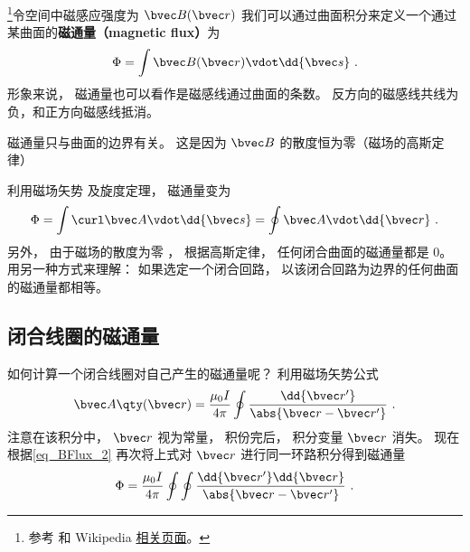 
\begin{issues}
\issueDraft
{}
\end{issues}


\footnote{参考 \cite{GriffE} 和 Wikipedia \href{https://en.wikipedia.org/wiki/Magnetic_flux}{相关页面}。}令空间中磁感应强度为 $\bvec B(\bvec r)$ 我们可以通过曲面积分来定义一个通过某曲面的\textbf{磁通量（magnetic flux）}为
\begin{equation}
\Phi  = \int \bvec B(\bvec r) \vdot \dd{\bvec s}~.
\end{equation}
形象来说， 磁通量也可以看作是磁感线通过曲面的条数。 反方向的磁感线共线为负，和正方向磁感线抵消。

磁通量只与曲面的边界有关。 这是因为 $\bvec B$ 的散度恒为零（磁场的高斯定律）


利用磁场矢势%
及旋度定理， %
磁通量变为
\begin{equation} \label{eq_BFlux_2}
\Phi  = \int \curl \bvec A \vdot \dd{\bvec s}  = \oint \bvec A \vdot \dd{\bvec r}~.
\end{equation}
另外， 由于磁场的散度为零%
， 根据高斯定律， 任何闭合曲面的磁通量都是 0。 用另一种方式来理解： 如果选定一个闭合回路， 以该闭合回路为边界的任何曲面的磁通量都相等。

\subsection{闭合线圈的磁通量}

如何计算一个闭合线圈对自己产生的磁通量呢？ 利用磁场矢势公式
\begin{equation}
\bvec A \qty(\bvec r) = \frac{\mu_0 I}{4 \pi} \oint \frac{\dd{\bvec r'}}{\abs{\bvec r - \bvec r'}}~.
\end{equation}
注意在该积分中， $\bvec r$ 视为常量， 积份完后， 积分变量 $\bvec r$ 消失。 现在根据\autoref{eq_BFlux_2} 再次将上式对 $\bvec r$ 进行同一环路积分得到磁通量
\begin{equation}
\Phi  = \frac{\mu_0 I}{4\pi} \oint\oint \frac{\dd{\bvec r'} \dd{\bvec r}}{\abs{\bvec r - \bvec r'}}~.
\end{equation}
